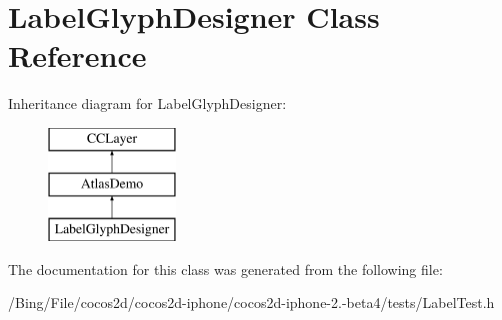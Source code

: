 \hypertarget{interface_label_glyph_designer}{\section{Label\-Glyph\-Designer Class Reference}
\label{interface_label_glyph_designer}
}
Inheritance diagram for Label\-Glyph\-Designer\-:\begin{figure}[H]
\begin{center}
\leavevmode
\includegraphics[height=3.000000cm]{interface_label_glyph_designer}
\end{center}
\end{figure}


The documentation for this class was generated from the following file\-:\begin{DoxyCompactItemize}
\item 
/\-Bing/\-File/cocos2d/cocos2d-\/iphone/cocos2d-\/iphone-\/2.-\/beta4/tests/Label\-Test.\-h\end{DoxyCompactItemize}
